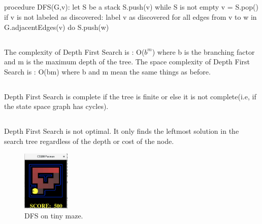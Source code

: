 \documentclass[
10pt, %
a4paper, %
oneside, %
headinclude,footinclude, %
BCOR5mm, %
]{scrartcl}
\newcommand\tab[1][1cm]{\hspace*{#1}}
\begin{document}
\subsection*{}
\tab procedure DFS(G,v):\newline
\tab\tab let S be a stack\newline
\tab\tab S.push(v)\newline
\tab\tab while S is not empty\newline
\tab\tab\tab v = S.pop()\newline
\tab\tab\tab if v is not labeled as discovered:\newline
\tab\tab\tab\tab label v as discovered\newline
\tab\tab\tab\tab for all edges from v to w in G.adjacentEdges(v) do \newline
\tab\tab\tab\tab\tab S.push(w)\newline

\subsection*{}
The complexity of Depth First Search is : O($b^m$)\newline
where b is the branching factor and m is the maximum depth of the tree.\newline
The space complexity of Depth First Search is : O(bm)\newline
where b and m mean the same things as before.

\subsection*{}
Depth First Search is complete if the tree is finite or else it is not complete(i.e, if the state space graph has cycles).

\subsection*{}
Depth First Search is not optimal. It only finds the leftmost solution in the search tree regardless of the depth or cost of the node.


\begin{figure}[h!]
	\centering
	\includegraphics[width=0.20\textwidth]{images/fig_1_dfs_tinymaze.png}
	\caption{ DFS on tiny maze.}
	\label{fig:fig_1_dfs_tinymaze}
\end{figure}
\end{document}
